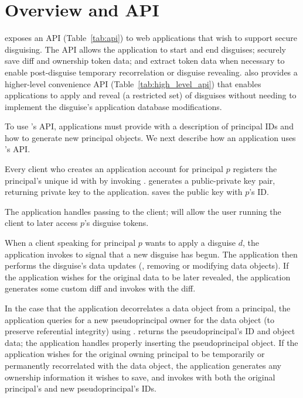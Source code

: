 \section{Overview and API}
\label{s:api}

\sys exposes an API (Table~\ref{tab:api}) to web applications that wish to support secure
disguising.
%
The API allows the application to start and end disguises; securely save diff and ownership token
data; and extract token data when necessary to enable post-disguise temporary recorrelation or
disguise revealing.
%
\sys also provides a higher-level convenience API (Table~\ref{tab:high_level_api}) that enables
applications to apply and reveal (a restricted set) of disguises without needing to implement the
disguise's application database modifications.

To use \sys's API, applications must provide \sys with a description of principal IDs and how to
generate new principal objects.
We next describe how an application uses \sys's API.

Every client who creates an application account for principal $p$ registers the principal's unique id 
with \sys by invoking . \sys generates a public-private key pair, returning private key  to the
application. \sys saves the public key  with $p$'s ID.

The application handles passing  to the client;  will allow the user running the
client to later access $p$'s disguise tokens.

When a client speaking for principal $p$ wants to apply a disguise $d$,
the application invokes  to signal \sys that a new disguise has begun.
The application then performs the disguise's data updates (\eg, removing or modifying
data objects). If the application wishes for the original data to be later revealed, the
application generates some custom diff and invokes  with the diff.

In the case that the application decorrelates a data object from a principal, the application
queries \sys for a new pseudoprincipal owner for the data object (to preserve referential integrity)
using . \sys returns the pseudoprincipal's ID and object data; the
application handles properly inserting the pseudoprincipal object.  If the application wishes for
the original owning principal to be temporarily or permanently recorrelated with the data object,
the application generates any ownership information it wishes to save, and invokes
 with both the original principal's and new pseudoprincipal's IDs.

